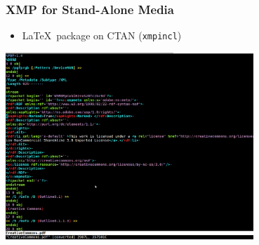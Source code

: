 \documentclass[mathserif,xcolor=dvipsnames,handout]{beamer}
\begin{document}
    \begin{frame}[t]
        \frametitle{XMP for Stand-Alone Media}
        \begin{itemize}
            \item \LaTeX\ package on CTAN (\texttt{xmpincl})
        \end{itemize}
        \begin{center}
            \includegraphics[width=0.7\textwidth]{embedded_xmp.png}
        \end{center}
    \end{frame}
\end{document}
